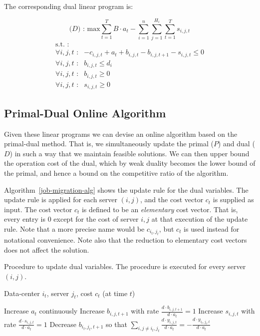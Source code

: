 The corresponding dual linear program is:

\[
\textrm{($D$) : max}   \sum^{T}_{t=1}B \cdot a_t - \sum^{n}_{i=1}\sum^{H_i}_{j=1}\sum^{T}_{t=1}s_{i,j,t}
\]
\[
	\begin{array}{rc}
	\textrm{s.t. :} & \\
		\forall i,j,t \textrm{ :}	    & -c_{i,j,t} + a_t + b_{i,j,t} - b_{i,j,t+1} - s_{i,j,t} \leq 0 \\
		\forall i,j,t \textrm{ :}	    & b_{i,j,t} \leq d_i \\
		\forall i,j,t \textrm{ :}	    & b_{i,j,t} \geq 0 \\
		\forall i,j,t \textrm{ :}	    & s_{i,j,t} \geq 0
	\end{array}
\]

\subsection{Primal-Dual Online Algorithm}
\label{pd-alg}

Given these  linear programs we can devise an online algorithm based on the primal-dual method.
That is, we simultaneously update the primal ($P$) and dual ($D$) in such a way that we maintain feasible solutions.
We can then upper bound the operation cost of the dual, which by weak duality becomes the lower bound of the primal, and hence a bound on the competitive ratio of the algorithm.

Algorithm~\ref{job-migration-alg} shows the update rule for the dual variables.
The update rule is applied for each server $(i,j)$, and the cost vector $c_{t}$ is supplied as input.
The cost vector $c_t$ is defined to be an \emph{elementary} cost vector. That is, every entry is $0$ except for the cost of server $i,j$ at that execution of the update rule.
Note that a more precise name would be $c_{i_t,j_t}$, but $c_t$ is used instead for notational convenience.
Note also that the reduction to elementary cost vectors does not affect the solution.

\begin{algorithm}
\caption{Procedure to update dual variables. The procedure is executed for every server $(i,j)$.}
\label{job-migration-alg}
\begin{algorithmic}[1]
\REQUIRE Data-center $i_t$, server $j_t$, cost $c_t$ (at time $t$)

 \STATE Increase $a_t$ continuously 
  \STATE Increase $b_{i,j,t+1}$ with rate $\frac{d \cdot b_{i,j,t+1}}{d \cdot a_t} = 1$
 \ENDFOR
  \STATE Increase $s_{i,j,t}$ with rate $\frac{d \cdot s_{i,j,t}}{d \cdot a_t}=1$
 \ENDFOR
  \STATE Decrease $b_{i_t,j_t,t+1}$ so that $\sum_{i,j \neq i_t,j_t}\frac{d \cdot y_{i,j,t}}{d \cdot a_t} = -\frac{d \cdot y_{i_t,j_t,t}}{d \cdot a_t}$
 \ENDFOR
\ENDWHILE
\end{algorithmic}
\end{algorithm}

